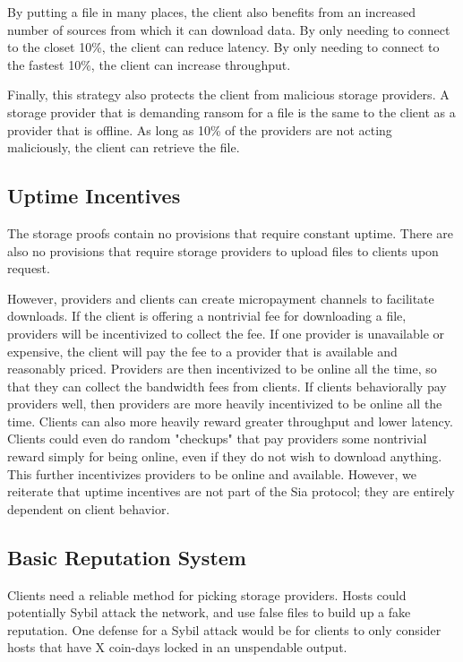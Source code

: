 \documentclass[twocolumn]{article}
\begin{document}
By putting a file in many places, the client also benefits from an increased number of sources from which it can download data.
By only needing to connect to the closet 10\%, the client can reduce latency.
By only needing to connect to the fastest 10\%, the client can increase throughput.

Finally, this strategy also protects the client from malicious storage providers.
A storage provider that is demanding ransom for a file is the same to the client as a provider that is offline.
As long as 10\% of the providers are not acting maliciously, the client can retrieve the file.

\subsection{Uptime Incentives}
The storage proofs contain no provisions that require constant uptime.
There are also no provisions that require storage providers to upload files to clients upon request.

However, providers and clients can create micropayment channels to facilitate downloads.
If the client is offering a nontrivial fee for downloading a file, providers will be incentivized to collect the fee.
If one provider is unavailable or expensive, the client will pay the fee to a provider that is available and reasonably priced.
Providers are then incentivized to be online all the time, so that they can collect the bandwidth fees from clients.
If clients behaviorally pay providers well, then providers are more heavily incentivized to be online all the time.
Clients can also more heavily reward greater throughput and lower latency.
Clients could even do random "checkups" that pay providers some nontrivial reward simply for being online, even if they do not wish to download anything.
This further incentivizes providers to be online and available.
However, we reiterate that uptime incentives are not part of the Sia protocol; they are entirely dependent on client behavior.

\subsection{Basic Reputation System}
Clients need a reliable method for picking storage providers.
Hosts could potentially Sybil attack the network, and use false files to build up a fake reputation.
One defense for a Sybil attack would be for clients to only consider hosts that have X coin-days locked in an unspendable output.
\end{document}
